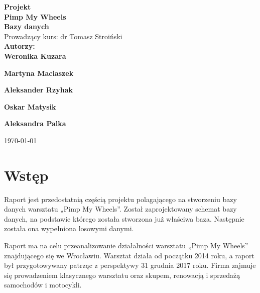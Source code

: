 \documentclass{article}\usepackage[]{graphicx}\usepackage[]{xcolor}
\date{\now}
\begin{document}
\begin{titlepage}
\end{titlepage}
\begin{center}
 {\LARGE\bfseries Projekt\\}
 \vspace{0.5cm}
 {\Huge\bfseries \color{magenta} Pimp My Wheels\\}
 \vspace{0.5cm}
 {\LARGE\bfseries Bazy danych\\}
 {\Large Prowadzący kurs: dr Tomasz Stroiński\\}
 \vspace{1cm}
 {\Large\bfseries Autorzy:\\[4pt]}
 \vspace{1.5cm}
  {\Large\bfseries Weronika Kuzara\\[3pt]}
  \vspace{0.5cm}
 
 {\Large\bfseries Martyna Maciaszek\\[3pt]}
 \vspace{0.5cm}
 
 {\Large\bfseries Aleksander Rzyhak\\[3pt]}
 \vspace{0.5cm}
 
 {\Large\bfseries Oskar Matysik\\[3pt]}
 \vspace{0.5cm}
 
 {\Large\bfseries Aleksandra Palka\\[5pt]}

 \vfill
{\Large \today}
\end{center}
\newpage



\section{Wstęp}
Raport jest przedostatnią częścią projektu polagającego na stworzeniu bazy danych warsztatu „Pimp My Wheels”. Został zaprojektowany schemat bazy danych, na podstawie którego została stworzona już właściwa baza. Następnie została ona wypełniona losowymi danymi.

Raport ma na celu przeanalizowanie działalności warsztatu „Pimp My Wheels” znajdującego się we Wrocławiu. Warsztat działa od początku 2014 roku, a raport był przygotowywany patrząc z perspektywy 31 grudnia 2017 roku. Firma zajmuje się prowadzeniem klasycznego warsztatu oraz skupem, renowacją i sprzedażą samochodów i motocykli. 
\end{document}
